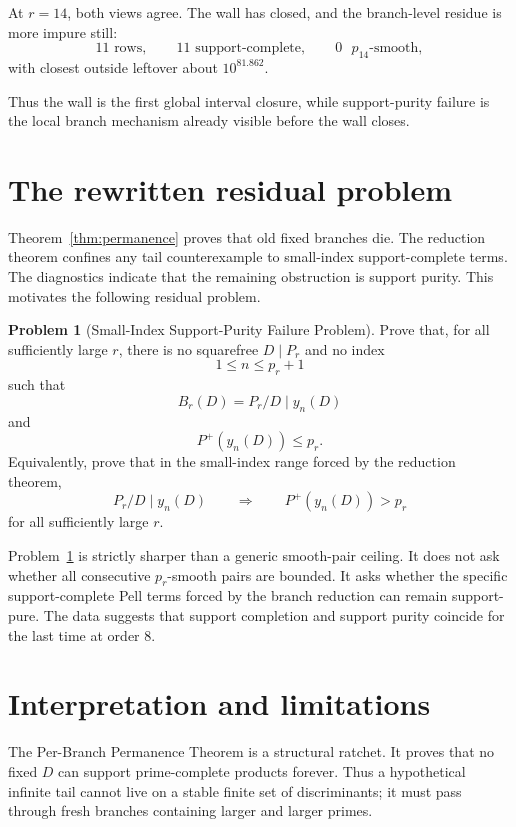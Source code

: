 \documentclass[11pt]{article}
\theoremstyle{definition}
\newtheorem{problem}[theorem]{Problem}
\newcommand{\Pplus}{P^{+}}
\begin{document}
At $r=14$, both views agree.  The wall has closed, and the branch-level residue is
more impure still:
\[
  11\text{ rows},\qquad 11\text{ support-complete},\qquad 0\text{ }p_{14}\text{-smooth},
\]
with closest outside leftover about $10^{81.862}$.

Thus the wall is the first global interval closure, while support-purity failure
is the local branch mechanism already visible before the wall closes.

\section{The rewritten residual problem}\label{sec:residual}

Theorem~\ref{thm:permanence} proves that old fixed branches die.  The reduction
theorem confines any tail counterexample to small-index support-complete terms.
The diagnostics indicate that the remaining obstruction is support purity.  This
motivates the following residual problem.

\begin{problem}[Small-Index Support-Purity Failure Problem]\label{prob:purity}
Prove that, for all sufficiently large $r$, there is no squarefree $D\mid P_r$
and no index
\[
  1\le n\le p_r+1
\]
such that
\[
  B_r(D)=P_r/D\mid y_n(D)
\]
and
\[
  \Pplus(y_n(D))\le p_r.
\]
Equivalently, prove that in the small-index range forced by the reduction
theorem,
\[
  P_r/D\mid y_n(D)
  \qquad\Longrightarrow\qquad
  \Pplus(y_n(D))>p_r
\]
for all sufficiently large $r$.
\end{problem}

Problem~\ref{prob:purity} is strictly sharper than a generic smooth-pair ceiling.
It does not ask whether all consecutive $p_r$-smooth pairs are bounded.  It asks
whether the specific support-complete Pell terms forced by the branch reduction
can remain support-pure.  The data suggests that support completion and support
purity coincide for the last time at order $8$.

\section{Interpretation and limitations}

The Per-Branch Permanence Theorem is a structural ratchet.  It proves that no
fixed $D$ can support prime-complete products forever.  Thus a hypothetical
infinite tail cannot live on a stable finite set of discriminants; it must pass
through fresh branches containing larger and larger primes.
\end{document}
